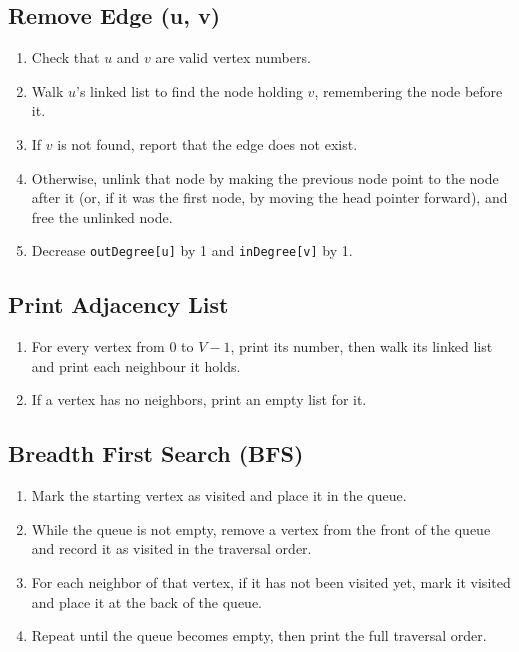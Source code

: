 \documentclass[11pt]{article}
\begin{document}
\subsection{Remove Edge (u, v)}
\begin{enumerate}[topsep=2pt, itemsep=2pt]
  \item Check that $u$ and $v$ are valid vertex numbers.
  \item Walk $u$'s linked list to find the node holding $v$, remembering the node before it.
  \item If $v$ is not found, report that the edge does not exist.
  \item Otherwise, unlink that node by making the previous node point to the node after it (or, if it was the first node, by moving the head pointer forward), and free the unlinked node.
  \item Decrease \texttt{outDegree[u]} by 1 and \texttt{inDegree[v]} by 1.
\end{enumerate}

\subsection{Print Adjacency List}
\begin{enumerate}[topsep=2pt, itemsep=2pt]
  \item For every vertex from 0 to $V-1$, print its number, then walk its linked list and print each neighbour it holds.
  \item If a vertex has no neighbors, print an empty list for it.
\end{enumerate}

\subsection{Breadth First Search (BFS)}
\begin{enumerate}[topsep=2pt, itemsep=2pt]
  \item Mark the starting vertex as visited and place it in the queue.
  \item While the queue is not empty, remove a vertex from the front of the queue and record it as visited in the traversal order.
  \item For each neighbor of that vertex, if it has not been visited yet, mark it visited and place it at the back of the queue.
  \item Repeat until the queue becomes empty, then print the full traversal order.
\end{enumerate}
\end{document}
